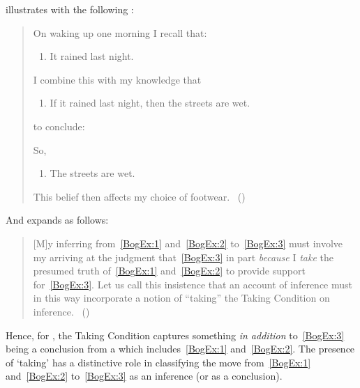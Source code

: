 \begin{note}
  \citeauthor{Boghossian:2014aa} illustrates with the following \scen{}:
  \begin{quote}
    On waking up one morning I recall that:

    \begin{enumerate}[label=(\arabic*), ref=(\arabic*), series=BogEx]
    \item
      \label{BogEx:1}
      It rained last night.
    \end{enumerate}

    I combine this with my knowledge that

    \begin{enumerate}[label=(\arabic*), ref=(\arabic*), resume*=BogEx]
    \item
      \label{BogEx:2}
      If it rained last night, then the streets are wet.
    \end{enumerate}

    to conclude:

    So,

    \begin{enumerate}[label=(\arabic*), ref=(\arabic*), resume*=BogEx]
    \item
      \label{BogEx:3}
      The streets are wet.
    \end{enumerate}
    This belief then affects my choice of footwear.%
    \mbox{ }\hfill\mbox{(\citeyear[2]{Boghossian:2014aa})}
  \end{quote}

  And \citeauthor{Boghossian:2014aa} expands as follows:

  \begin{quote}
    [M]y inferring from~\ref{BogEx:1} and~\ref{BogEx:2} to~\ref{BogEx:3} must involve my arriving at the judgment that~\ref{BogEx:3} in part \emph{because} I \emph{take} the presumed truth of~\ref{BogEx:1} and~\ref{BogEx:2} to provide support for~\ref{BogEx:3}.
    Let us call this insistence that an account of inference must in this way incorporate a notion of ``taking'' the Taking Condition on inference.%
    \mbox{ }\hfill\mbox{(\citeyear[4]{Boghossian:2014aa})}
  \end{quote}

  Hence, for \citeauthor{Boghossian:2014aa}, the Taking Condition captures something \emph{in addition} to~\ref{BogEx:3} being a conclusion from a \poP{} which includes~\ref{BogEx:1} and~\ref{BogEx:2}.
  The presence of `taking' has a distinctive role in classifying the move from~\ref{BogEx:1} and~\ref{BogEx:2} to~\ref{BogEx:3} as an inference (or as a conclusion).


\end{note}
